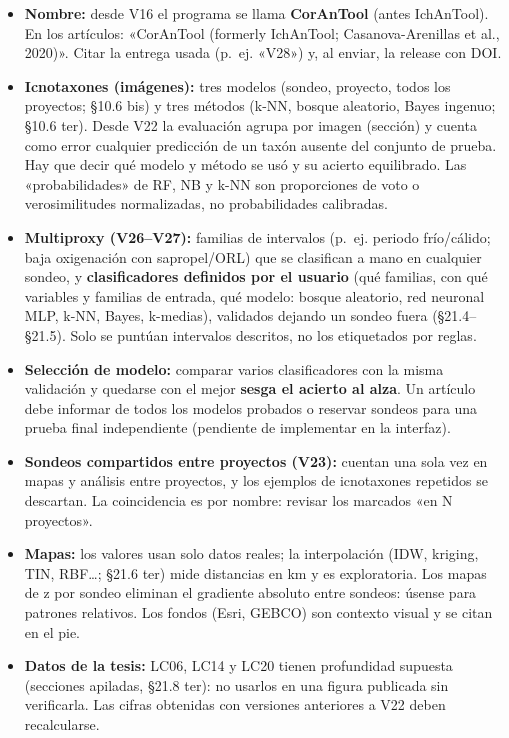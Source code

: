 \documentclass[
  10pt,
]{article}
\providecommand{\tightlist}{%
  \setlength{\itemsep}{0pt}\setlength{\parskip}{0pt}}
\begin{document}
\begin{itemize}
\tightlist
\item
  \textbf{Nombre:} desde V16 el programa se llama \textbf{CorAnTool}
  (antes IchAnTool). En los artículos: «CorAnTool (formerly IchAnTool;
  Casanova-Arenillas et al., 2020)». Citar la entrega usada (p.~ej.
  «V28») y, al enviar, la release con DOI.
\item
  \textbf{Icnotaxones (imágenes):} tres modelos (sondeo, proyecto, todos
  los proyectos; §10.6 bis) y tres métodos (k-NN, bosque aleatorio,
  Bayes ingenuo; §10.6 ter). Desde V22 la evaluación agrupa por imagen
  (sección) y cuenta como error cualquier predicción de un taxón ausente
  del conjunto de prueba. Hay que decir qué modelo y método se usó y su
  acierto equilibrado. Las «probabilidades» de RF, NB y k-NN son
  proporciones de voto o verosimilitudes normalizadas, no probabilidades
  calibradas.
\item
  \textbf{Multiproxy (V26--V27):} familias de intervalos (p.~ej. periodo
  frío/cálido; baja oxigenación con sapropel/ORL) que se clasifican a
  mano en cualquier sondeo, y \textbf{clasificadores definidos por el
  usuario} (qué familias, con qué variables y familias de entrada, qué
  modelo: bosque aleatorio, red neuronal MLP, k-NN, Bayes, k-medias),
  validados dejando un sondeo fuera (§21.4--§21.5). Solo se puntúan
  intervalos descritos, no los etiquetados por reglas.
\item
  \textbf{Selección de modelo:} comparar varios clasificadores con la
  misma validación y quedarse con el mejor \textbf{sesga el acierto al
  alza}. Un artículo debe informar de todos los modelos probados o
  reservar sondeos para una prueba final independiente (pendiente de
  implementar en la interfaz).
\item
  \textbf{Sondeos compartidos entre proyectos (V23):} cuentan una sola
  vez en mapas y análisis entre proyectos, y los ejemplos de icnotaxones
  repetidos se descartan. La coincidencia es por nombre: revisar los
  marcados «en N proyectos».
\item
  \textbf{Mapas:} los valores usan solo datos reales; la interpolación
  (IDW, kriging, TIN, RBF\ldots; §21.6 ter) mide distancias en km y es
  exploratoria. Los mapas de z por sondeo eliminan el gradiente absoluto
  entre sondeos: úsense para patrones relativos. Los fondos (Esri,
  GEBCO) son contexto visual y se citan en el pie.
\item
  \textbf{Datos de la tesis:} LC06, LC14 y LC20 tienen profundidad
  supuesta (secciones apiladas, §21.8 ter): no usarlos en una figura
  publicada sin verificarla. Las cifras obtenidas con versiones
  anteriores a V22 deben recalcularse.
\end{itemize}
\end{document}
